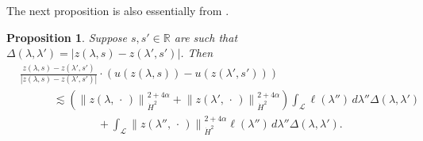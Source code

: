 \documentclass[reqno,centertags,12pt]{amsart}
\newtheorem{proposition}[theorem]{Proposition}
\theoremstyle{definition}
\numberwithin{equation}{section}
\newcommand{\abs}[1]{\left\lvert#1\right\rvert}
\newcommand{\norm}[1]{\left\|#1\right\|}
\newcommand{\bbR}{{\mathbb{R}}}
\begin{document}
The next proposition is also essentially from \cite{JeonZla21}.

\begin{proposition}
    Suppose $s,s'\in\bbR$ are such that
    $\Delta(\lambda,\lambda') = \abs{z(\lambda,s) - z(\lambda',s')}$. Then
    \begin{align*}
        &\frac{z(\lambda,s) - z(\lambda',s')}{\abs{z(\lambda,s) - z(\lambda',s')}}
        \cdot(u(z(\lambda,s)) - u(z(\lambda',s'))) \\
        &\quad\quad\quad
        \lesssim
        \left(
            \norm{z(\lambda,\,\cdot\,)}_{\dot{H}^{2}}^{2+4\alpha}+
            \norm{z(\lambda',\,\cdot\,)}_{\dot{H}^{2}}^{2+4\alpha}
        \right)
        \int_{\mathcal{L}}\ell(\lambda'')\,d\lambda''
        \Delta(\lambda,\lambda') \\
        &\quad\quad\quad\quad\quad\quad\quad
        + \int_{\mathcal{L}}
        \norm{z(\lambda'',\,\cdot\,)}_{\dot{H}^{2}}^{2+4\alpha}\ell(\lambda'')
        \,d\lambda''\Delta(\lambda,\lambda').
    \end{align*}
\end{proposition}
\end{document}
